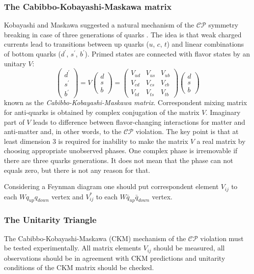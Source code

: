 \documentclass[preprint,aps,showpacs]{revtex4}
\newcommand{\cpconj}{\ensuremath{\mathcal{CP}}\xspace}
\begin{document}
\subsubsection{The Cabibbo-Kobayashi-Maskawa matrix}
Kobayashi and Maskawa suggested a natural mechanism of the \cpconj symmetry breaking in case of three generations of quarks \cite{KM}. The idea is that weak charged currents lead to transitions between up quarks ($u$, $c$, $t$) and linear combinations of bottom quarks ($d^{\prime}$, $s^{\prime}$, $b^{\prime}$). Primed states are connected with flavor states by an unitary $V$:
\begin{equation}\label{eq:CKM-matrix}
 \left(\begin{array}{c} d^{\prime}\\s^{\prime}\\b^{\prime}\end{array}\right)=V\left(\begin{array}{c} d\\s\\b\end{array}\right)=\left(\begin{array}{ccc} V_{ud}&V_{us}&V_{ub}\\V_{cd}&V_{cs}&V_{cb}\\V_{td}&V_{ts}&V_{tb}\end{array}\right)\left(\begin{array}{c} d\\s\\b\end{array}\right)
\end{equation}
known as the {\it Cabibbo-Kobayashi-Maskawa matrix}. Correspondent mixing matrix for anti-quarks is obtained by complex conjugation of the matrix $V$. Imaginary part of $V$ leads to difference between flavor-changing interactions for matter and anti-matter and, in other words, to the \cpconj violation. The key point is that at least dimension $3$ is required for inability to make the matrix $V$ a real matrix by choosing appropriate unobserved phases. One complex phase is irremovable if there are three quarks generations. It does not mean that the phase can not equals zero, but there is not any reason for that.

Considering a Feynman diagram one should put correspondent element $V_{ij}$ to each $Wq_{up}q_{down}$ vertex and $V^{*}_{ij}$ to each $W\bar q_{up}\bar q_{down}$ vertex.

\subsubsection{The Unitarity Triangle}
The Cabibbo-Kobayashi-Maskawa (CKM) mechanism of the \cpconj violation must be tested experimentally. All matrix elements $V_{ij}$ should be measured, all observations should be in agreement with CKM predictions and unitarity conditions of the CKM matrix should be checked.
\end{document}

